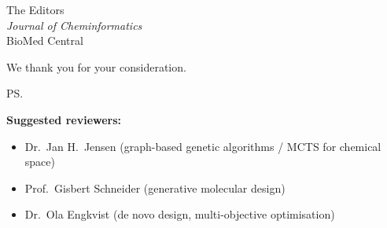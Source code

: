 \documentclass[11pt,a4paper]{letter}
\begin{document}
\begin{letter}{%
  The Editors \\
  \textit{Journal of Cheminformatics} \\
  BioMed Central
}
\closing{We thank you for your consideration.}

\ps{%
\textbf{Suggested reviewers:}\\
\begin{itemize}[leftmargin=*, itemsep=1pt]
  \item Dr.\ Jan H.\ Jensen (graph-based genetic algorithms / MCTS for chemical space)
  \item Prof.\ Gisbert Schneider (generative molecular design)
  \item Dr.\ Ola Engkvist (de novo design, multi-objective optimisation)
\end{itemize}
}

\end{letter}
\end{document}
